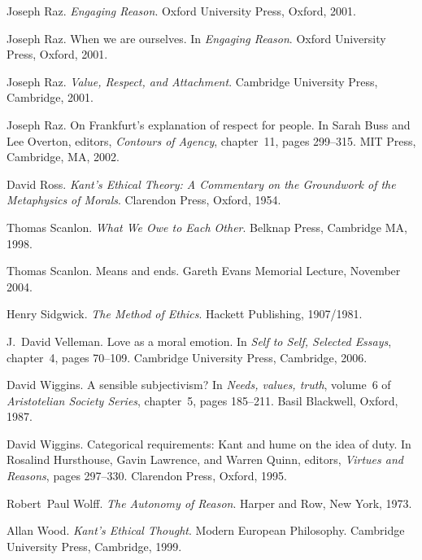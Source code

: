 \documentclass[a4paper,12pt]{article}
\begin{document}
\begin{thebibliography}{24}
Joseph Raz.
\newblock \emph{Engaging Reason}.
\newblock Oxford University Press, Oxford, 2001{}.

Joseph Raz.
\newblock When we are ourselves.
\newblock In \emph{Engaging Reason}. Oxford University Press, Oxford,
  2001{}.

Joseph Raz.
\newblock \emph{Value, Respect, and Attachment}.
\newblock Cambridge University Press, Cambridge, 2001{}.

Joseph Raz.
\newblock On {F}rankfurt's explanation of respect for people.
\newblock In Sarah Buss and Lee Overton, editors, \emph{Contours of Agency},
  chapter~11, pages 299--315. MIT Press, Cambridge, MA, 2002.

David Ross.
\newblock \emph{Kant's Ethical Theory: A Commentary on the Groundwork of the
  Metaphysics of Morals}.
\newblock Clarendon Press, Oxford, 1954.

Thomas Scanlon.
\newblock \emph{What We Owe to Each Other}.
\newblock Belknap Press, Cambridge MA, 1998.

Thomas Scanlon.
\newblock Means and ends.
\newblock Gareth Evans Memorial Lecture, November 2004.

Henry Sidgwick.
\newblock \emph{The Method of Ethics}.
\newblock Hackett Publishing, 1907/1981.

J.~David Velleman.
\newblock Love as a moral emotion.
\newblock In \emph{Self to Self, Selected Essays}, chapter~4, pages 70--109.
  Cambridge University Press, Cambridge, 2006.

David Wiggins.
\newblock A sensible subjectivism?
\newblock In \emph{Needs, values, truth}, volume~6 of \emph{Aristotelian
  Society Series}, chapter~5, pages 185--211. Basil Blackwell, Oxford, 1987.

David Wiggins.
\newblock Categorical requirements: Kant and hume on the idea of duty.
\newblock In Rosalind Hursthouse, Gavin Lawrence, and Warren Quinn, editors,
  \emph{Virtues and Reasons}, pages 297--330. Clarendon Press, Oxford, 1995.

Robert~Paul Wolff.
\newblock \emph{The Autonomy of Reason}.
\newblock Harper and Row, New York, 1973.

Allan Wood.
\newblock \emph{Kant's Ethical Thought}.
\newblock Modern European Philosophy. Cambridge University Press, Cambridge,
  1999.

\end{thebibliography}
\end{document}
